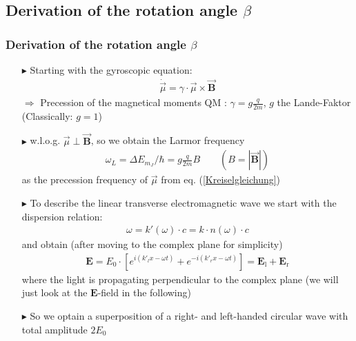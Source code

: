 \documentclass[11pt,a4paper]{beamer}
\begin{document}
\begin{frame}
\subsection{Derivation of the rotation angle $\beta$}
\frametitle{Derivation of the rotation angle $\beta$}
\begin{itemize}
\item[$\blacktriangleright$]
Starting with the gyroscopic equation:
\begin{align}
\dot{\vec{\mu}} = \gamma\cdot\vec{\mu}\times\vec{\textbf{B}}
\label{Kreiselgleichung}
\end{align}
$\Rightarrow$ Precession of the magnetical moments
\newline \newline
QM : $\gamma = g\frac{q}{2m}$, $g$ the Lande-Faktor
(Classically: $g=1$)\newline \newline
\item[$\blacktriangleright$]
w.l.o.g. $\vec{\mu} \perp \vec{\textbf{B}}$, so we obtain the Larmor frequency
\begin{align}
\omega_L = \Delta E_{m_J}/ \hbar = g\frac{q}{2m}B \qquad (B = |\vec{\textbf{B}}|)
\label{Larmorfrequenz}
\end{align}
as the precession frequency of $\vec{\mu}$ from eq. (\ref{Kreiselgleichung})
\end{itemize}
\end{frame}
\begin{frame}
\begin{itemize}
\item[$\blacktriangleright$]
To describe the linear transverse electromagnetic wave we start with the dispersion relation:
\begin{align}
\omega = k'(\omega)\cdot c = k\cdot n(\omega)\cdot c
\label{Dispersionsrelation}
\end{align}
and obtain (after moving to the complex plane for simplicity)
 \begin{align}
\textbf{E} = E_0\cdot[e^{i( k'_l x - \omega t)}+e^{-i( k'_r x - \omega t )}] = \textbf{E}_{\text{l}} + \textbf{E}_{\text{r}}
\label{Lichtwelle_1}
 \end{align} 
where the light is propagating perpendicular to the complex plane (we will just look at the $\textbf{E}$-field in the following)\newline
\item[$\blacktriangleright$] So we optain a superposition of a right- and left-handed circular wave with total amplitude $2E_0$
\end{itemize}
\end{frame}
\end{document}
